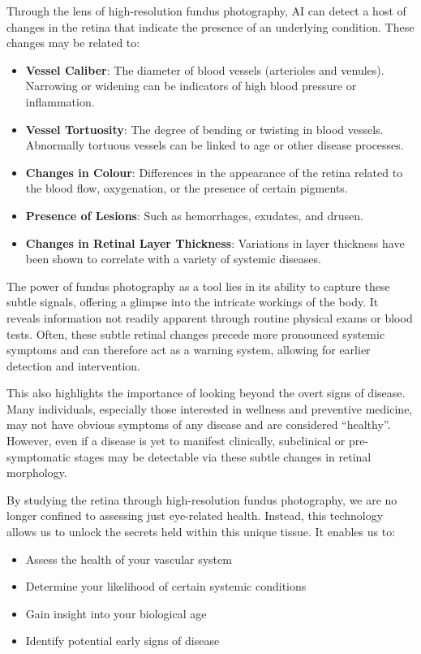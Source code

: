 \documentclass[
  Letterpaper,
]{scrbook}
\begin{document}
Through the lens of high-resolution fundus photography, AI can detect a
host of changes in the retina that indicate the presence of an
underlying condition. These changes may be related to:

\begin{itemize}
\item
  \textbf{Vessel Caliber}: The diameter of blood vessels (arterioles and
  venules). Narrowing or widening can be indicators of high blood
  pressure or inflammation.
\item
  \textbf{Vessel Tortuosity}: The degree of bending or twisting in blood
  vessels. Abnormally tortuous vessels can be linked to age or other
  disease processes.
\item
  \textbf{Changes in Colour}: Differences in the appearance of the
  retina related to the blood flow, oxygenation, or the presence of
  certain pigments.
\item
  \textbf{Presence of Lesions}: Such as hemorrhages, exudates, and
  drusen.
\item
  \textbf{Changes in Retinal Layer Thickness}: Variations in layer
  thickness have been shown to correlate with a variety of systemic
  diseases.
\end{itemize}

The power of fundus photography as a tool lies in its ability to capture
these subtle signals, offering a glimpse into the intricate workings of
the body. It reveals information not readily apparent through routine
physical exams or blood tests. Often, these subtle retinal changes
precede more pronounced systemic symptoms and can therefore act as a
warning system, allowing for earlier detection and intervention.

This also highlights the importance of looking beyond the overt signs of
disease. Many individuals, especially those interested in wellness and
preventive medicine, may not have obvious symptoms of any disease and
are considered ``healthy''. However, even if a disease is yet to
manifest clinically, subclinical or pre-symptomatic stages may be
detectable via these subtle changes in retinal morphology.

By studying the retina through high-resolution fundus photography, we
are no longer confined to assessing just eye-related health. Instead,
this technology allows us to unlock the secrets held within this unique
tissue. It enables us to:

\begin{itemize}
\item
  Assess the health of your vascular system
\item
  Determine your likelihood of certain systemic conditions
\item
  Gain insight into your biological age
\item
  Identify potential early signs of disease
\end{itemize}
\end{document}
